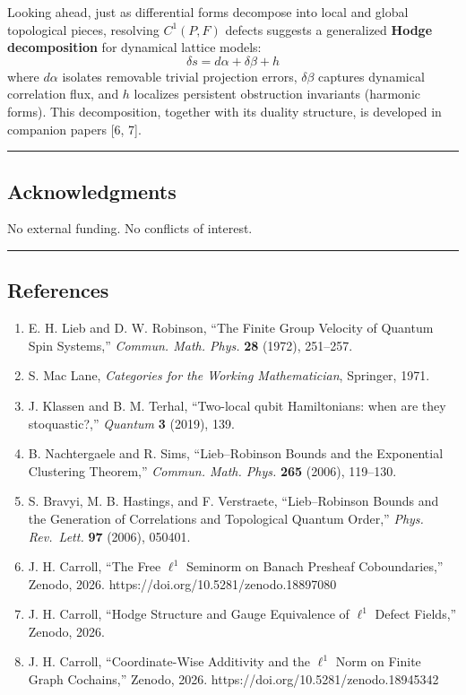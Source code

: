 \documentclass[
]{article}
\providecommand{\tightlist}{%
  \setlength{\itemsep}{0pt}\setlength{\parskip}{0pt}}
\begin{document}
Looking ahead, just as differential forms decompose into local and
global topological pieces, resolving \(C^1(P, F)\) defects suggests a
generalized \textbf{Hodge decomposition} for dynamical lattice models:
\[ \delta s = d\alpha + \delta\beta + h \] where \(d\alpha\) isolates
removable trivial projection errors, \(\delta\beta\) captures dynamical
correlation flux, and \(h\) localizes persistent obstruction invariants
(harmonic forms). This decomposition, together with its duality
structure, is developed in companion papers {[}6, 7{]}.

\begin{center}\rule{0.5\linewidth}{0.5pt}\end{center}

\subsection{Acknowledgments}\label{acknowledgments}

No external funding. No conflicts of interest.

\begin{center}\rule{0.5\linewidth}{0.5pt}\end{center}

\subsection{References}\label{references}

\begin{enumerate}
\def\labelenumi{\arabic{enumi}.}
\tightlist
\item
  E. H. Lieb and D. W. Robinson, ``The Finite Group Velocity of Quantum
  Spin Systems,'' \emph{Commun. Math. Phys.} \textbf{28} (1972),
  251--257.
\item
  S. Mac Lane, \emph{Categories for the Working Mathematician},
  Springer, 1971.
\item
  J. Klassen and B. M. Terhal, ``Two-local qubit Hamiltonians: when are
  they stoquastic?,'' \emph{Quantum} \textbf{3} (2019), 139.
\item
  B. Nachtergaele and R. Sims, ``Lieb--Robinson Bounds and the
  Exponential Clustering Theorem,'' \emph{Commun. Math. Phys.}
  \textbf{265} (2006), 119--130.
\item
  S. Bravyi, M. B. Hastings, and F. Verstraete, ``Lieb--Robinson Bounds
  and the Generation of Correlations and Topological Quantum Order,''
  \emph{Phys. Rev.~Lett.} \textbf{97} (2006), 050401.
\item
  J. H. Carroll, ``The Free \(\ell^1\) Seminorm on Banach Presheaf
  Coboundaries,'' Zenodo, 2026. https://doi.org/10.5281/zenodo.18897080
\item
  J. H. Carroll, ``Hodge Structure and Gauge Equivalence of \(\ell^1\)
  Defect Fields,'' Zenodo, 2026.
\item
  J. H. Carroll, ``Coordinate-Wise Additivity and the \(\ell^1\) Norm on
  Finite Graph Cochains,'' Zenodo, 2026.
  https://doi.org/10.5281/zenodo.18945342
\end{enumerate}
\end{document}

